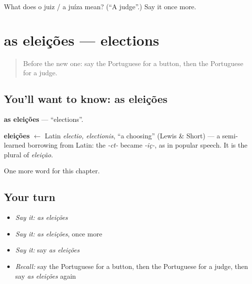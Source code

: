 \begin{tcolorbox}[breakable,colback=teal!4,colframe=teal!35!black,title={Before you move on}]
What does o juiz / a juíza mean? (\textquotedblleft{}A judge\textquotedblright{}.) Say it once more.
\end{tcolorbox}
\section[as eleições]{as eleições — elections}

\label{lesson:PT-C189-eleicoes}



\begin{quote}
Before the new one: say the Portuguese for a button, then the Portuguese for a judge.
\end{quote}

\subsection*{You'll want to know: as eleições}
\textbf{as eleições} — \textquotedblleft{}elections\textquotedblright{}.

\begin{cousinweb}
\textbf{eleições} $\leftarrow$ Latin \emph{electio, electionis}, \textquotedblleft{}a choosing\textquotedblright{} (Lewis \& Short) — a semi-learned borrowing from Latin: the \emph{-ct-} became \emph{-iç-}, as in popular speech. It is the plural of \emph{eleição}.
\end{cousinweb}

\begin{grammarlens}[title={What you've built}]
One more word for this chapter.
\end{grammarlens}

\subsection*{Your turn}
\begin{itemize}
\raggedright
  \item \emph{Say it:} \emph{as eleições}
  \item \emph{Say it:} \emph{as eleições}, once more
  \item \emph{Say it:} say \emph{as eleições}
  \item \emph{Recall:} say the Portuguese for a button, then the Portuguese for a judge, then say \emph{as eleições} again
\end{itemize}

